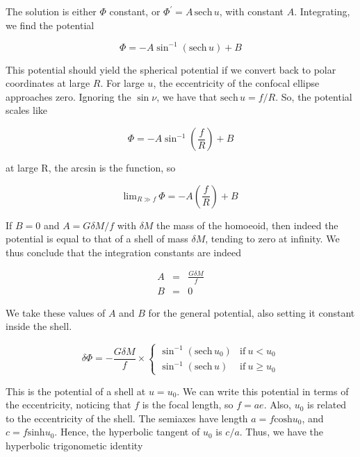 The solution is either $\varPhi$ constant, or $\varPhi^\prime = A\,\mathrm{sech}\,u$, with constant $A$. Integrating, we find the potential 

\begin{equation}
\varPhi = -A\sin^{-1}\left(\mathrm{sech}\,u\right) + B 
\end{equation}


This potential should yield the spherical potential if we convert back to polar coordinates at large $R$. For large $u$, the eccentricity of the confocal ellipse approaches zero. Ignoring the $\sin\nu$,  we have that $\mathrm{sech}\,u = f/R$. So, the potential scales like  


\begin{equation}
\varPhi = -A\sin^{-1}\left(\frac{f}{R}\right) + B 
\end{equation}

at large R, the arcsin is the function, so  

\begin{equation}
\mathrm{lim}_{R \gg f }\ \varPhi = -A\left(\frac{f}{R}\right) + B 
\end{equation}

If $B =0$ and $A = G\delta M/f$ with $\delta M$ the mass of the homoeoid, then indeed the potential is equal to that of a shell of mass $\delta M$, tending to zero at infinity. We thus conclude that the integration constants are indeed 

\begin{eqnarray}
A&=&\frac{G\delta M}{f}\\
B&=&0
\end{eqnarray}

We take these values of $A$ and $B$ for the general potential, also setting it constant inside the shell. 

\begin{equation}
\delta\varPhi = -\frac{G\delta M}{f} \times \left\{ \begin{array}{cc} 
\sin^{-1}(\mathrm{sech}\,u_0) & \mathrm{if} \ u < u_0 \\
\sin^{-1}(\mathrm{sech}\,u) & \mathrm{if} \ u \geq u_0
\end{array} \right.
\end{equation}

This is the potential of a shell at $u=u_0$. We can write this potential in terms of the eccentricity, noticing that $f$ is the focal length, so $f=ae$. Also, $u_0$ is related to the eccentricity of the shell. The semiaxes have length $a = f \mathrm{cosh} u_0$, and $c=f\mathrm{sinh} u_0$. Hence, the hyperbolic tangent of $u_0$ is $c/a$. Thus, we have the hyperbolic trigonometic identity  

